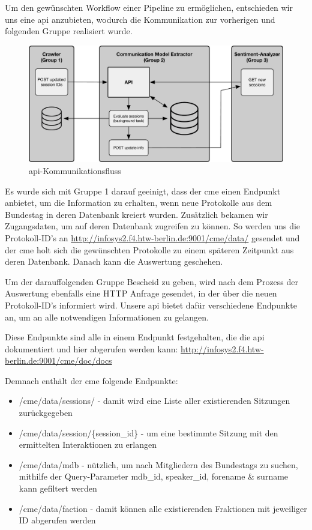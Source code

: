 Um den gewünschten Workflow einer Pipeline zu ermöglichen, entschieden wir
uns eine \gls{api} anzubieten, wodurch die Kommunikation zur vorherigen und
folgenden Gruppe realisiert wurde.

\begin{figure}[ht]
    \begin{center}
        \includegraphics[width=\textwidth]{images/03-cme/Communications.pdf}
    \end{center}
    \caption{\gls{api}-Kommunikationsfluss}
    \label{fig:03_api_call_flow}
\end{figure}

Es wurde sich mit Gruppe 1 darauf geeinigt, dass der \gls{cme} einen Endpunkt
anbietet, um die Information zu erhalten, wenn neue Protokolle aus dem
Bundestag in deren Datenbank kreiert wurden. Zusätzlich bekamen wir
Zugangsdaten, um auf deren Datenbank zugreifen zu können. So werden uns die
Protokoll-ID's an \url{http://infosys2.f4.htw-berlin.de:9001/cme/data/} gesendet
und der \gls{cme} holt sich die gewünschten Protokolle zu einem späteren Zeitpunkt
aus deren Datenbank. Danach kann die Auswertung geschehen.

Um der darauffolgenden Gruppe Bescheid zu geben, wird nach dem Prozess der
Auswertung ebenfalls eine HTTP Anfrage gesendet, in der über die neuen
Protokoll-ID's informiert wird. Unsere \gls{api} bietet dafür verschiedene Endpunkte
an, um an alle notwendigen Informationen zu gelangen.

Diese Endpunkte sind alle in einem Endpunkt festgehalten, die die \gls{api}
dokumentiert und hier abgerufen werden kann:
\url{http://infosys2.f4.htw-berlin.de:9001/cme/doc/docs}

Demnach enthält der \gls{cme} folgende Endpunkte:
\begin{itemize}
    \item /cme/data/sessions/ - damit wird eine Liste aller existierenden
    Sitzungen zurückgegeben
    \item /cme/data/session/\{session\_id\} - um eine bestimmte Sitzung mit den
    ermittelten Interaktionen zu erlangen
    \item /cme/data/mdb - nützlich, um nach Mitgliedern des Bundestags zu
    suchen, mithilfe der Query-Parameter mdb\_id, speaker\_id, forename
    \& surname kann gefiltert werden
    \item /cme/data/faction - damit können alle existierenden Fraktionen mit
    jeweiliger ID abgerufen werden
\end{itemize}

